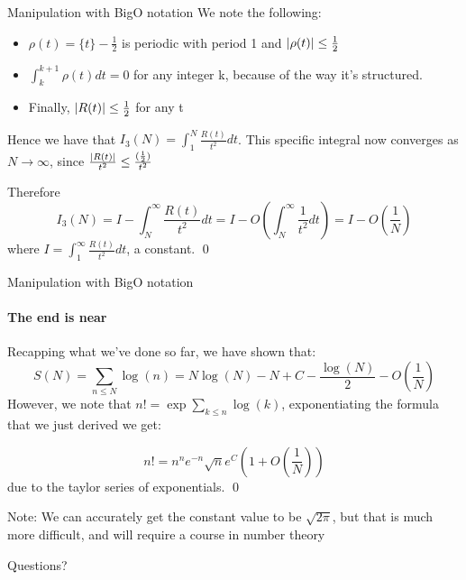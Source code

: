 \documentclass[aspectratio=169, handout]{beamer}
\begin{document}
\begin{frame}{Manipulation with BigO notation}
    We note the following:
    \begin{itemize}
        \item $\rho(t) = \{t\} - \frac{1}{2}$ is periodic with period 1 and $\abs{\rho(t)} \le \frac{1}{2}$\pause
        \item $\int_k^{k+1} \rho(t) dt = 0$ for any integer k, because of the way it's structured. \pause 
        \item Finally, $\abs{R(t)} \le \frac{1}{2}$ for any t \pause
    \end{itemize}
    Hence we have that $I_3(N) = \int_1^N \frac{R(t)}{t^2} dt$.
    This specific integral now converges as $N \to \infty$, since $\frac{\abs{R(t)}}{t^2} \le \frac{(\frac{1}{2})}{t^2}$ \pause

    Therefore $$I_3(N) = I - \int_N^\infty \frac{R(t)}{t^2} dt = I - O(\int_N^\infty \frac{1}{t^2} dt) = I - O(\frac{1}{N})$$
    where $I = \int_1^\infty \frac{R(t)}{t^2} dt$, a constant. 
    \qed
\end{frame}

\begin{frame}{Manipulation with BigO notation}
    \framesubtitle{The end is near}
    Recapping what we've done so far, we have shown that:
    $$S(N) = \sum_{n \le N} \log(n) = N\log(N) - N + C - \frac{\log(N)}{2} - O(\frac{1}{N})$$
\pause
    However, we note that $n! = \exp{\sum_{k \le n} \log(k)}$, exponentiating the formula that we just derived we get:

    $$n! = n^ne^{-n}\sqrt{n}e^C(1 + O(\frac{1}{N}))$$ due to the taylor series of exponentials.
    \qed

    Note: We can accurately get the constant value to be $\sqrt{2\pi}$, but that is much more difficult, and will require a course in number theory
\end{frame}

\begin{frame}{}
      \begin{center}
    {\color{sigma@mainblue} \LARGE Questions?}
  \end{center}
\end{frame}
\end{document}
